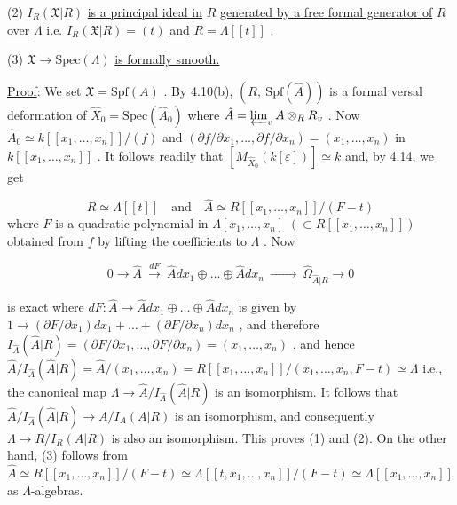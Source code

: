 (2)  $I_R(\mathfrak{X}|R)$  \underline{is a principal ideal in}  $R$  \underline{generated by a free formal generator of}  $R$  \underline{over}  $\Lambda$  i.e.  $I_R(\mathfrak{X}|R) = (t)$  \underline{and}  $R = \Lambda[[t]]$  .

(3)  $\mathfrak{X} \rightarrow \mathrm{Spec}(\Lambda)$  \underline{is formally smooth.}

\underline{Proof}:  We set  $\mathfrak{X} = \mathrm{Spf}(A)$  . By 4.10(b),  $(R,\ \mathrm{Spf}(\hat{A}))$  is a formal versal deformation of  $\hat{X}_0 = \mathrm{Spec}(\hat{A}_0)$  where  $\hat{A} = \varprojlim_{v} A \otimes_R R_v$  . Now  $\hat{A}_0 \simeq k[[x_1,\dots,x_n]]/(f)$  and  $(\partial f/\partial x_1,\dots,\partial f/\partial x_n) = (x_1,\dots,x_n)$  in $k[[x_1,\dots,x_n]]$  . It follows readily that  $[\underline{M}_{\hat{X}_0}(k[\varepsilon])] \simeq k$  and, by 4.14, we get

\begin{equation*}
R \simeq \Lambda[[t]] \quad\text{and}\quad \hat{A} \simeq R[[x_1,\dots,x_n]]/(F - t)
\end{equation*}
where  $F$  is a quadratic polynomial in  $\Lambda[x_1,\dots,x_n]$  $(\subset R[[x_1,\dots,x_n]])$ obtained from  $f$  by lifting the coefficients to  $\Lambda$  . Now

\begin{equation*}
0 \rightarrow \hat{A} \ \overset{dF}{\longrightarrow}\ \hat{A}dx_1 \oplus \dots \oplus \hat{A}dx_n \ \xrightarrow{\hspace{3em}}\ \hat{\Omega}_{\hat{A}|R} \rightarrow 0 
\end{equation*}


 is exact where  $dF : \hat{A} \rightarrow \hat{A}dx_1 \oplus \dots \oplus \hat{A}dx_n$  is given by $1 \rightarrow (\partial F/\partial x_1)dx_1 + \dots + (\partial F/\partial x_n)dx_n$  , and therefore $I_{\hat{A}}(\hat{A}|R) = (\partial F/\partial x_1,\dots,\partial F/\partial x_n) = (x_1,\dots,x_n)$  , and hence $\hat{A}/I_{\hat{A}}(\hat{A}|R) = \hat{A}/(x_1,\dots,x_n) = R[[x_1,\dots,x_n]]/(x_1,\dots,x_n,F - t) \simeq \Lambda$ i.e., the canonical map  $\Lambda \rightarrow \hat{A}/I_{\hat{A}}(\hat{A}|R)$  is an isomorphism. It follows that $\hat{A}/I_{\hat{A}}(\hat{A}|R) \rightarrow A/I_A(A|R)$  is an isomorphism, and consequently  $\Lambda \rightarrow R/I_R(A|R)$  is also an isomorphism. This proves (1) and (2). On the other hand, (3) follows from $\hat{A} \simeq R[[x_1,\dots,x_n]]/(F - t) \simeq \Lambda[[t,x_1,\dots,x_n]]/(F - t) \simeq \Lambda[[x_1,\dots,x_n]]$   as $\Lambda$-algebras.

